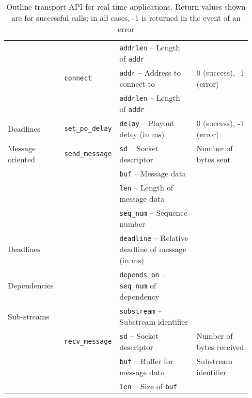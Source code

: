 \documentclass{sig-alternate-05-2015}
\begin{document}
\begin{table*}[t]
\begin{tabularx}{\linewidth}{llll}
                                   &          & \texttt{addrlen} -- Length of \texttt{addr} & \\
                                   & \texttt{connect}
                                              & \texttt{addr} -- Address to connect to         & 0 (success), -1 (error) \\
                                   &          & \texttt{addrlen} -- Length of \texttt{addr} & \\
    \midrule
      Deadlines                    & \texttt{set\_po\_delay}
                                              & \texttt{delay} -- Playout delay (in ms)        & 0 (success), -1 (error) \\
    \midrule
      Message oriented             & \texttt{send\_message}
                                              & \texttt{sd} -- Socket descriptor               & Number of bytes sent \\
                                   &          & \texttt{buf} -- Message data & \\
                                   &          & \texttt{len} -- Length of message data & \\
                                   &          & \texttt{seq\_num} -- Sequence number & \\
      Deadlines                    &          & \texttt{deadline} -- Relative deadline of message (in ms) & \\
      Dependencies                 &          & \texttt{depends\_on} -- \texttt{seq\_num} of dependency & \\
      Sub-streams                  &          & \texttt{substream} -- Substream identifier & \\
                                   & \texttt{recv\_message}
                                              & \texttt{sd} -- Socket descriptor               & Number of bytes received \\
                                   &          & \texttt{buf} -- Buffer for message data        & Substream identifier \\
                                   &          & \texttt{len} -- Size of \texttt{buf} & \\
    \bottomrule
  \end{tabularx}
  \caption{Outline transport API for real-time applications. Return values
  shown are for successful calls; in all cases, -1 is returned in the event
  of an error}
  \label{tab:api}
\end{table*}
\end{document}
